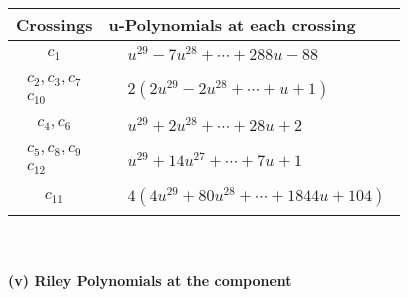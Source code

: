 \documentclass[1p]{elsarticle_modified}
\theoremstyle{definition}
\begin{document}
\begin{tabular}{m{50pt}|m{274pt}}
Crossings & \hspace{64pt}u-Polynomials at each crossing \\
\hline $$\begin{aligned}c_{1}\end{aligned}$$&$\begin{aligned}
&u^{29}-7 u^{28}+\cdots+288 u-88
\end{aligned}$\\
\hline $$\begin{aligned}c_{2},c_{3},c_{7}\\c_{10}\end{aligned}$$&$\begin{aligned}
&2(2 u^{29}-2 u^{28}+\cdots+u+1)
\end{aligned}$\\
\hline $$\begin{aligned}c_{4},c_{6}\end{aligned}$$&$\begin{aligned}
&u^{29}+2 u^{28}+\cdots+28 u+2
\end{aligned}$\\
\hline $$\begin{aligned}c_{5},c_{8},c_{9}\\c_{12}\end{aligned}$$&$\begin{aligned}
&u^{29}+14 u^{27}+\cdots+7 u+1
\end{aligned}$\\
\hline $$\begin{aligned}c_{11}\end{aligned}$$&$\begin{aligned}
&4(4 u^{29}+80 u^{28}+\cdots+1844 u+104)
\end{aligned}$\\
\hline
\end{tabular}\\~\\
\newpage\renewcommand{\arraystretch}{1}
\flushleft \textbf{(v) Riley Polynomials at the component}\newline \\
\end{document}
